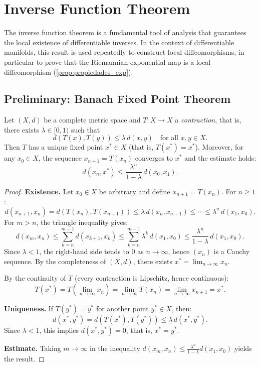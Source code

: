
\section{Inverse Function Theorem}\label{sec:funcion_inversa}

The inverse function theorem is a fundamental tool of analysis that guarantees the local existence of differentiable inverses. In the context of differentiable manifolds, this result is used repeatedly to construct local diffeomorphisms, in particular to prove that the Riemannian exponential map is a local diffeomorphism (\autoref{prop:propiedades_exp}).

\subsection{Preliminary: Banach Fixed Point Theorem}\label{subsec:punto_fijo_banach}

\begin{theorem}\label{thm:punto_fijo_banach}
Let $(X, d)$ be a complete metric space and $T: X \to X$ a \textit{contraction}, that is, there exists $\lambda \in [0, 1)$ such that
\[
d(T(x), T(y)) \leq \lambda \, d(x, y) \quad \text{for all } x, y \in X.
\]
Then $T$ has a unique fixed point $x^* \in X$ (that is, $T(x^*) = x^*$). Moreover, for any $x_0 \in X$, the sequence $x_{n+1} = T(x_n)$ converges to $x^*$ and the estimate holds:
\[
d(x_n, x^*) \leq \frac{\lambda^n}{1 - \lambda} \, d(x_0, x_1).
\]
\end{theorem}

\begin{proof}
\textbf{Existence.} Let $x_0 \in X$ be arbitrary and define $x_{n+1} = T(x_n)$. For $n \geq 1$:
\[
d(x_{n+1}, x_n) = d(T(x_n), T(x_{n-1})) \leq \lambda \, d(x_n, x_{n-1}) \leq \cdots \leq \lambda^n \, d(x_1, x_0).
\]
For $m > n$, the triangle inequality gives:
\[
d(x_m, x_n) \leq \sum_{k=n}^{m-1} d(x_{k+1}, x_k) \leq \sum_{k=n}^{m-1} \lambda^k \, d(x_1, x_0) \leq \frac{\lambda^n}{1 - \lambda} \, d(x_1, x_0).
\]
Since $\lambda < 1$, the right-hand side tends to $0$ as $n \to \infty$, hence $(x_n)$ is a Cauchy sequence. By the completeness of $(X, d)$, there exists $x^* = \lim_{n \to \infty} x_n$.

By the continuity of $T$ (every contraction is Lipschitz, hence continuous):
\[
T(x^*) = T\!\left(\lim_{n \to \infty} x_n\right) = \lim_{n \to \infty} T(x_n) = \lim_{n \to \infty} x_{n+1} = x^*.
\]

\textbf{Uniqueness.} If $T(y^*) = y^*$ for another point $y^* \in X$, then:
\[
d(x^*, y^*) = d(T(x^*), T(y^*)) \leq \lambda \, d(x^*, y^*).
\]
Since $\lambda < 1$, this implies $d(x^*, y^*) = 0$, that is, $x^* = y^*$.

\textbf{Estimate.} Taking $m \to \infty$ in the inequality $d(x_m, x_n) \leq \frac{\lambda^n}{1-\lambda} d(x_1, x_0)$ yields the result.
\end{proof}

